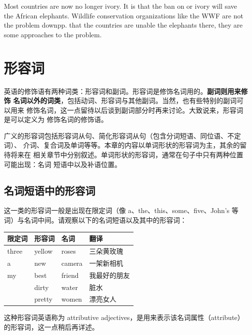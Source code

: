 Most countries are now no longer  ivory. It is 
that the ban on  or  ivory will save the
 African elephants. Wildlife conservation organizations like
the WWF are not  the problem  down{pp}. 
that the  countries are unable  the
elephants there, they are  some 
approaches to  the problem.

\chapter{形容词}

英语的修饰语有两种词类：形容词和副词。形容词是修饰名词用的。\textbf{副词则用来修饰
  名词以外的词类}，包括动词、形容词与其他副词。当然，也有些特别的副词可以用来
修饰名词，这一点留待以后谈到副词部分时再来讨论。大致说来，形容词是可以定义为
修饰名词的修饰语。

广义的形容词包括形容词从句、简化形容词从句（包含分词短语、同位语、不定词）、
介词、复合词及单词等等。本章的内容以单词形状的形容词为主，其余的留待将来在
相关章节中分别叙述。单词形状的形容词，通常在句子中只有两种位置可能出现：名词
短语中以及补语位置。

\section{名词短语中的形容词}

这一类的形容词一般是出现在限定词（像 a、the、this、some、five、John's
等词）与名词中间。请观察以下的名词短语以及其中的形容词：

\begin{longtable}[]{@{}llll@{}}
  \toprule\noalign{}
  限定词 & 形容词 & 名词 & 翻译 \\
  \midrule\noalign{}
  \endhead
  \bottomrule\noalign{}
  \endlastfoot
  three & yellow & roses & 三朵黄玫瑰 \\
  a & new & camera & 一架新相机 \\
  my & best & friend & 我最好的朋友 \\
         & dirty & water & 脏水 \\
         & pretty & women & 漂亮女人 \\
\end{longtable}

这种形容词英语称为 attributive adjectives，是用来表示该名词属性（attribute）
的形容词，这一点稍后再详述。

